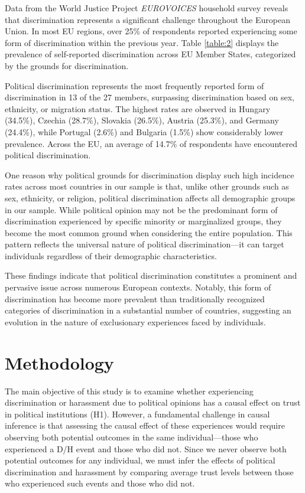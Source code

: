 \documentclass{article}
\begin{document}
Data from the World Justice Project \emph{EUROVOICES} household survey reveals that discrimination represents a significant challenge throughout the European Union. In most EU regions, over 25\% of respondents reported experiencing some form of discrimination within the previous year. Table \ref{table:2} displays the prevalence of self-reported discrimination across EU Member States, categorized by the grounds for discrimination.

Political discrimination represents the most frequently reported form of discrimination in 13 of the 27 members, surpassing discrimination based on sex, ethnicity, or migration status. The highest rates are observed in Hungary (34.5\%), Czechia (28.7\%), Slovakia (26.5\%), Austria (25.3\%), and Germany (24.4\%), while Portugal (2.6\%) and Bulgaria (1.5\%) show considerably lower prevalence. Across the EU, an average of 14.7\% of respondents have encountered political discrimination.

One reason why political grounds for discrimination display such high incidence rates across most countries in our sample is that, unlike other grounds such as sex, ethnicity, or religion, political discrimination affects all demographic groups in our sample. While political opinion may not be the predominant form of discrimination experienced by specific minority or marginalized groups, they become the most common ground when considering the entire population. This pattern reflects the universal nature of political discrimination—it can target individuals regardless of their demographic characteristics.

These findings indicate that political discrimination constitutes a prominent and pervasive issue across numerous European contexts. Notably, this form of discrimination has become more prevalent than traditionally recognized categories of discrimination in a substantial number of countries, suggesting an evolution in the nature of exclusionary experiences faced by individuals.



\section{Methodology}

The main objective of this study is to examine whether experiencing discrimination or harassment due to political opinions has a causal effect on trust in political institutions (H1). However, a fundamental challenge in causal inference is that assessing the causal effect of these experiences would require observing both potential outcomes in the same individual—those who experienced a D/H event and those who did not. Since we never observe both potential outcomes for any individual, we must infer the effects of political discrimination and harassment by comparing average trust levels between those who experienced such events and those who did not.
\end{document}
